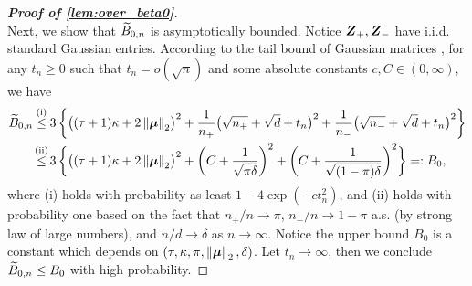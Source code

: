 \begin{proof}[\textbf{Proof of \cref{lem:over_beta0}}]
~\\
\noindent
Next, we show that $\widetilde B_{0, n}$ is asymptotically bounded. Notice $\text{\boldmath $Z$}_+, \text{\boldmath $Z$}_-$ have i.i.d. standard Gaussian entries. According to the tail bound of Gaussian matrices \cite[Corollary 7.3.3]{vershynin2018high}, for any $t_n \ge 0$ such that $t_n = o(\sqrt{n})$ and some absolute constants $c, C \in (0, \infty)$, we have
\begin{equation*}
    \begin{aligned}
        \wt B_{0, n} 
        & \overset{\mathmakebox[0pt][c]{\text{(i)}}}{\le} 
        3 \, \biggl\{  \bigl( (\tau + 1)\kappa + 2 \norm{\bmu}_2 \bigr)^2
        + 
        \frac{1}{n_+} \bigl(\sqrt{\smash[b]{n_+}} + \sqrt{d} + t_n \bigr)^2 + 
        \frac{1}{n_-} \bigl(\sqrt{\smash[b]{n_-}} + \sqrt{d} + t_n \bigr)^2  \biggr\} \\
        & \overset{\mathmakebox[0pt][c]{\text{(ii)}}}{\le}
        3 \, \biggl\{  \bigl( (\tau + 1)\kappa + 2 \norm{\bmu}_2 \bigr)^2
        + 
        \biggl(C + \frac{1}{\sqrt{\pi \delta}}       \biggr)^2 + 
        \biggl(C + \frac{1}{\sqrt{\smash[b]{(1 - \pi) \delta}}} \biggr)^2  \biggr\}
        =: B_{0} ,
    \end{aligned}
\end{equation*}
where (i) holds with probability as least $1 - 4 \exp(-c t_n^2)$, and (ii) holds with probability one based on the fact that $n_+/n \to \pi$, $n_-/n \to 1 - \pi$ a.s. (by strong law of large numbers), and $n/d \to \delta$ as $n \to \infty$. Notice the upper bound $B_0$ is a constant which depends on $(\tau, \kappa, \pi, \left\|{\text{\boldmath $\mu$}}\right\|_2, \delta)$.
Let $t_n \to \infty$, then we conclude $\widetilde B_{0, n} \le  B_{0}$ with high probability.


\end{proof}

